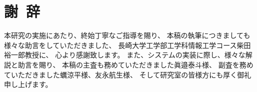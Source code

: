 \chapter*{謝~辞}

本研究の実施にあたり、終始丁寧なご指導を賜り、
本稿の執筆につきましても様々な助言をしていただきました、
長崎大学工学部工学科情報工学コース柴田裕一郎教授に、
心より感謝致します。
また、システムの実装に際し、様々な解説と助言を賜り、
本稿の主査も務めていただきました眞邉泰斗様、
副査を務めていただきました蠣涼平様、友永航生様、
そして研究室の皆様方にも厚く御礼申し上げます。
